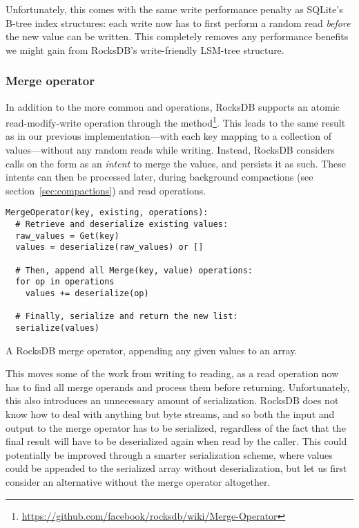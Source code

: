 Unfortunately, this comes with the same write performance penalty as SQLite's
B-tree index structures: each write now has to first perform a random read
\textit{before} the new value can be written. This completely removes any
performance benefits we might gain from RocksDB's write-friendly LSM-tree
structure.

\subsubsection{Merge operator}

In addition to the more common  and  operations, RocksDB
supports an atomic read-modify-write operation through the 
method\footnote{\url{https://github.com/facebook/rocksdb/wiki/Merge-Operator}}.
This leads to the same result as in our previous implementation---with each key
mapping to a collection of values---without any random reads while writing.
Instead, RocksDB considers calls on the form  as an
\textit{intent} to merge the values, and persists it as such. These intents can
then be processed later, during background compactions (see
section~\ref{sec:compactions}) and read operations.

\begin{listing}[H]
  \begin{verbatim}
MergeOperator(key, existing, operations):
  # Retrieve and deserialize existing values:
  raw_values = Get(key)
  values = deserialize(raw_values) or []

  # Then, append all Merge(key, value) operations:
  for op in operations
    values += deserialize(op)

  # Finally, serialize and return the new list:
  serialize(values)
  \end{verbatim}

  \caption{A RocksDB merge operator, appending any given values to an array.}\label{lst:merge-fn}
\end{listing}

This moves some of the work from writing to reading, as a read operation now has
to find all merge operands and process them before returning. Unfortunately,
this also introduces an unnecessary amount of serialization. RocksDB does not
know how to deal with anything but byte streams, and so both the input and
output to the merge operator has to be serialized, regardless of the fact that
the final result will have to be deserialized again when read by the caller.
This could potentially be improved through a smarter serialization scheme, where
values could be appended to the serialized array without deserialization, but
let us first consider an alternative without the merge operator altogether.

